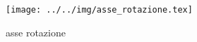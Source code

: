\begin{figure}[h]\centering\texttt{[image: ../../img/asse\_rotazione.tex]}\caption{asse rotazione}\label{fig:asse_rotazione}\end{figure}
